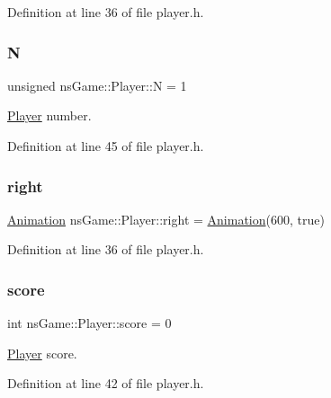 Definition at line 36 of file player.\+h.

\mbox{\label{classns_game_1_1_player_a6fc5b1fa9ec5ca495fedf4908942d2f0}} 
\subsubsection{\texorpdfstring{N}{N}}
{\footnotesize\ttfamily unsigned ns\+Game\+::\+Player\+::N = 1}



\hyperlink{classns_game_1_1_player}{Player} number. 



Definition at line 45 of file player.\+h.

\mbox{\label{classns_game_1_1_player_a90ec9f96623d92ed28938e3770c16936}} 
\subsubsection{\texorpdfstring{right}{right}}
{\footnotesize\ttfamily \hyperlink{classns_game_1_1_animation}{Animation} ns\+Game\+::\+Player\+::right = \hyperlink{classns_game_1_1_animation}{Animation}(600, true)}



Definition at line 36 of file player.\+h.

\mbox{\label{classns_game_1_1_player_af284db40fc7f885cc5ad889124e182c0}} 
\subsubsection{\texorpdfstring{score}{score}}
{\footnotesize\ttfamily int ns\+Game\+::\+Player\+::score = 0}



\hyperlink{classns_game_1_1_player}{Player} score. 



Definition at line 42 of file player.\+h.

\mbox{\label{classns_game_1_1_player_a1ef22765b2291da72b5c695a259160ec}} 
